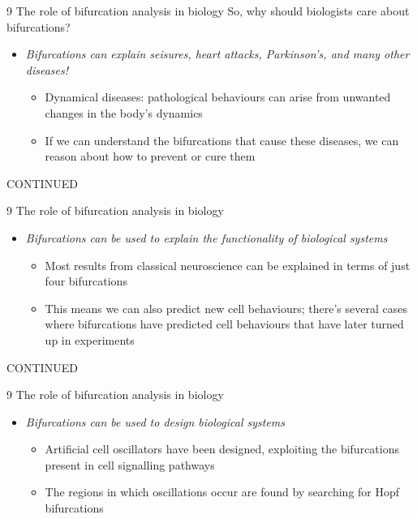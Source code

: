 \documentclass[presentation]{beamer}
\begin{document}
\begin{frame}[label={sec:orgdbf6a08}]{9 The role of bifurcation analysis in biology}
So, why should biologists care about bifurcations?   

\begin{itemize}
\item \emph{Bifurcations can explain seisures, heart attacks, Parkinson's, and many other diseases!}
\begin{itemize}
\item Dynamical diseases: pathological behaviours can arise from unwanted changes in the body's dynamics
\item If we can understand the bifurcations that cause these diseases, we can reason about how to prevent or cure them

\vfill
\end{itemize}
\end{itemize}
CONTINUED 
\end{frame}
\begin{frame}[label={sec:org733f0f7}]{9 The role of bifurcation analysis in biology}
\begin{itemize}
\item \emph{Bifurcations can be used to explain the functionality of biological systems}
\begin{itemize}
\item Most results from classical neuroscience can be explained in terms of just four bifurcations
\item This means we can also predict new cell behaviours; there's several cases where bifurcations have predicted cell behaviours that have later turned up in experiments

\vfill
\end{itemize}
\end{itemize}
CONTINUED 
\end{frame}
\begin{frame}[label={sec:org830f158}]{9 The role of bifurcation analysis in biology}
\begin{itemize}
\item \emph{Bifurcations can be used to design biological systems}
\begin{itemize}
\item Artificial cell oscillators have been designed, exploiting the bifurcations present in cell signalling pathways
\item The regions in which oscillations occur are found by searching for Hopf bifurcations
\end{itemize}
\end{itemize}
\end{frame}
\end{document}
